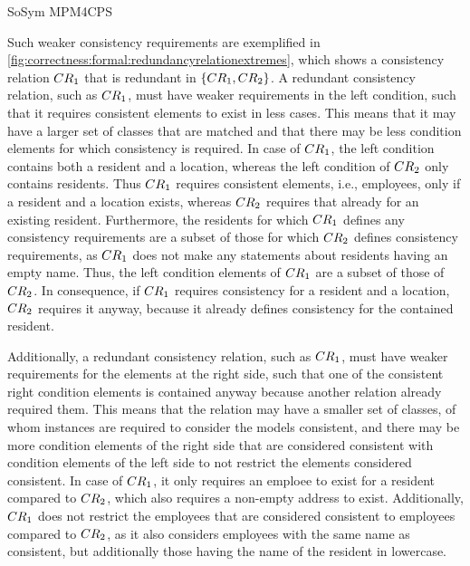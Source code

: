 \begin{copiedFrom}{SoSym MPM4CPS}
\begin{example}
Such weaker consistency requirements are exemplified in \autoref{fig:correctness:formal:redundancyrelationextremes}, which shows a consistency relation $CR_{1}$ that is redundant in $\{ CR_{1}, CR_{2} \}$.
A redundant consistency relation, such as $CR_{1}$, must have weaker requirements in the left condition, such that it requires consistent elements to exist in less cases.
This means that it may have a larger set of classes that are matched and that there may be less condition elements for which consistency is required.
In case of $CR_{1}$, the left condition contains both a resident and a location, whereas the left condition of $CR_{2}$ only contains residents.
Thus $CR_{1}$ requires consistent elements, i.e., employees, only if a resident and a location exists, whereas $CR_{2}$ requires that already for an existing resident.
Furthermore, the residents for which $CR_{1}$ defines any consistency requirements are a subset of those for which $CR_{2}$ defines consistency requirements, as $CR_{1}$ does not make any statements about residents having an empty name.
Thus, the left condition elements of $CR_{1}$ are a subset of those of $CR_{2}$.
In consequence, if $CR_{1}$ requires consistency for a resident and a location, $CR_{2}$ requires it anyway, because it already defines consistency for the contained resident.

Additionally, a redundant consistency relation, such as $CR_{1}$, must have weaker requirements for the elements at the right side, such that one of the consistent right condition elements is contained anyway because another relation already required them. 
This means that the relation may have a smaller set of classes, of whom instances are required to consider the models consistent, and there may be more condition elements of the right side that are considered consistent with condition elements of the left side to not restrict the elements considered consistent.
In case of $CR_{1}$, it only requires an emploee to exist for a resident compared to $CR_{2}$, which also requires a non-empty address to exist. Additionally, $CR_{1}$ does not restrict the employees that are considered consistent to employees compared to $CR_{2}$, as it also considers employees with the same name as consistent, but additionally those having the name of the resident in lowercase.
\end{example}


\end{copiedFrom}
